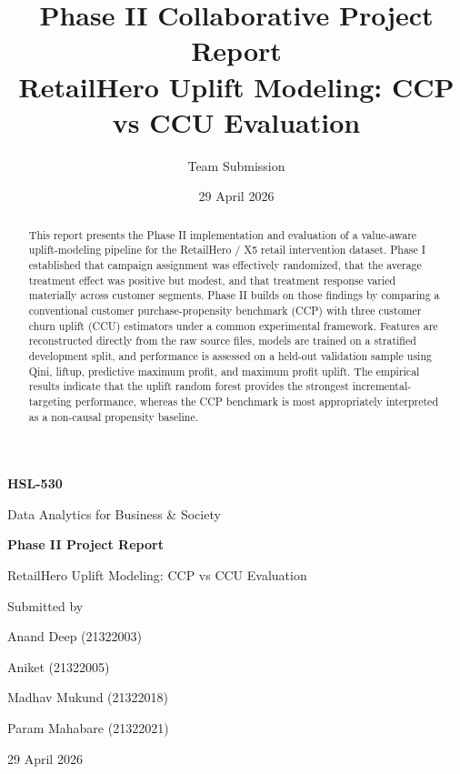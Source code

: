 \documentclass[11pt,a4paper]{article}
\title{Phase II Collaborative Project Report\\RetailHero Uplift Modeling: CCP vs CCU Evaluation}
\author{Team Submission}
\date{29 April 2026}
\begin{document}
\hypersetup{pageanchor=false}
\begin{titlepage}
\centering
{\Large \textbf{HSL-530}\par}
\vspace{0.25cm}
{\large Data Analytics for Business \& Society\par}

\vspace{2.2cm}
{\Huge \textbf{Phase II Project Report}\par}
\vspace{0.6cm}
{\LARGE RetailHero Uplift Modeling: CCP vs CCU Evaluation\par}

\vspace{1.8cm}
{\large Submitted by\par}
\vspace{0.4cm}
{\large Anand Deep (21322003)\par}
{\large Aniket (21322005)\par}
{\large Madhav Mukund (21322018)\par}
{\large Param Mahabare (21322021)\par}

\vfill
{\large 29 April 2026\par}
\end{titlepage}
\hypersetup{pageanchor=true}

\begin{abstract}
This report presents the Phase II implementation and evaluation of a value-aware uplift-modeling pipeline for the RetailHero / X5 retail intervention dataset. Phase I established that campaign assignment was effectively randomized, that the average treatment effect was positive but modest, and that treatment response varied materially across customer segments. Phase II builds on those findings by comparing a conventional customer purchase-propensity benchmark (CCP) with three customer churn uplift (CCU) estimators under a common experimental framework. Features are reconstructed directly from the raw source files, models are trained on a stratified development split, and performance is assessed on a held-out validation sample using Qini, liftup, predictive maximum profit, and maximum profit uplift. The empirical results indicate that the uplift random forest provides the strongest incremental-targeting performance, whereas the CCP benchmark is most appropriately interpreted as a non-causal propensity baseline.
\end{abstract}
\end{document}
